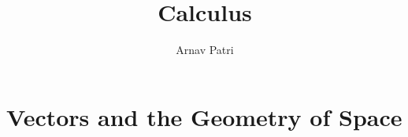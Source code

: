 \documentclass[12pt, A4]{report}
\title{Calculus \Roman{3}}
\author{Arnav Patri}
\begin{document}
	\maketitle
	\tableofcontents
	\setcounter{chapter}{11}
		\chapter{Vectors and the Geometry of Space}
			
\end{document}
